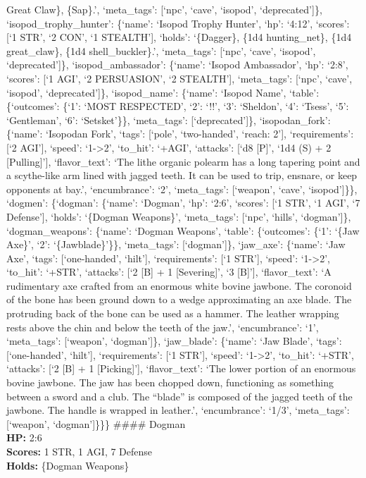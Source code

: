 \documentclass[
  letterpaper,
  DIV=11,
  numbers=noendperiod]{scrartcl}
\begin{document}
Great Claw\}, \{Sap\}.', `meta\_tags': {[}`npc', `cave', `isopod',
`deprecated'{]}\}, `isopod\_trophy\_hunter': \{`name': `Isopod Trophy
Hunter', `hp': `4:12', `scores': {[}`1 STR', `2 CON', `1 STEALTH'{]},
`holds': `\{Dagger\}, \{1d4 hunting\_net\}, \{1d4 great\_claw\}, \{1d4
shell\_buckler\}.', `meta\_tags': {[}`npc', `cave', `isopod',
`deprecated'{]}\}, `isopod\_ambassador': \{`name': `Isopod Ambassador',
`hp': `2:8', `scores': {[}`1 AGI', `2 PERSUASION', `2 STEALTH'{]},
`meta\_tags': {[}`npc', `cave', `isopod', `deprecated'{]}\},
`isopod\_name': \{`name': `Isopod Name', `table': \{`outcomes': \{`1':
`MOST RESPECTED', `2': `!!', `3': `Sheldon', `4': `Tsess', `5':
`Gentleman', `6': `Setsket'\}\}, `meta\_tags': {[}`deprecated'{]}\},
`isopodan\_fork': \{`name': `Isopodan Fork', `tags': {[}`pole',
`two-handed', `reach: 2'{]}, `requirements': {[}`2 AGI'{]}, `speed':
`1-\textgreater2', `to\_hit': `+AGI', `attacks': {[}`d8 {[}P{]}', `1d4
(S) + 2 {[}Pulling{]}'{]}, `flavor\_text': `The lithe organic polearm
has a long tapering point and a scythe-like arm lined with jagged teeth.
It can be used to trip, ensnare, or keep opponents at bay.',
`encumbrance': `2', `meta\_tags': {[}`weapon', `cave', `isopod'{]}\}\},
`dogmen': \{`dogman': \{`name': `Dogman', `hp': `2:6', `scores': {[}`1
STR', `1 AGI', `7 Defense'{]}, `holds': `\{Dogman Weapons\}',
`meta\_tags': {[}`npc', `hills', `dogman'{]}\}, `dogman\_weapons':
\{`name': `Dogman Weapons', `table': \{`outcomes': \{`1': `\{Jaw Axe\}',
`2': `\{Jawblade\}'\}\}, `meta\_tags': {[}`dogman'{]}\}, `jaw\_axe':
\{`name': `Jaw Axe', `tags': {[}`one-handed', `hilt'{]}, `requirements':
{[}`1 STR'{]}, `speed': `1-\textgreater2', `to\_hit': `+STR', `attacks':
{[}`2 {[}B{]} + 1 {[}Severing{]}', `3 {[}B{]}'{]}, `flavor\_text': `A
rudimentary axe crafted from an enormous white bovine jawbone. The
coronoid of the bone has been ground down to a wedge approximating an
axe blade. The protruding back of the bone can be used as a hammer. The
leather wrapping rests above the chin and below the teeth of the jaw.',
`encumbrance': `1', `meta\_tags': {[}`weapon', `dogman'{]}\},
`jaw\_blade': \{`name': `Jaw Blade', `tags': {[}`one-handed', `hilt'{]},
`requirements': {[}`1 STR'{]}, `speed': `1-\textgreater2', `to\_hit':
`+STR', `attacks': {[}`2 {[}B{]} + 1 {[}Picking{]}'{]}, `flavor\_text':
`The lower portion of an enormous bovine jawbone. The jaw has been
chopped down, functioning as something between a sword and a club. The
``blade'' is composed of the jagged teeth of the jawbone. The handle is
wrapped in leather.', `encumbrance': `1/3', `meta\_tags': {[}`weapon',
`dogman'{]}\}\}\} \#\#\#\# Dogman\\
\textbf{HP:} 2:6\\
\textbf{Scores:} 1 STR, 1 AGI, 7 Defense\\
\textbf{Holds:} \{Dogman Weapons\}
\end{document}
